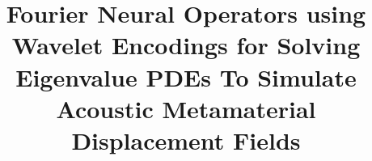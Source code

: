 \documentclass[preprint,review,12pt]{elsarticle}
\begin{document}
\linenumbers
\onehalfspacing

\begin{frontmatter}





\title{Fourier Neural Operators using Wavelet Encodings for Solving Eigenvalue PDEs To Simulate Acoustic Metamaterial Displacement Fields}



\end{frontmatter}
\end{document}
